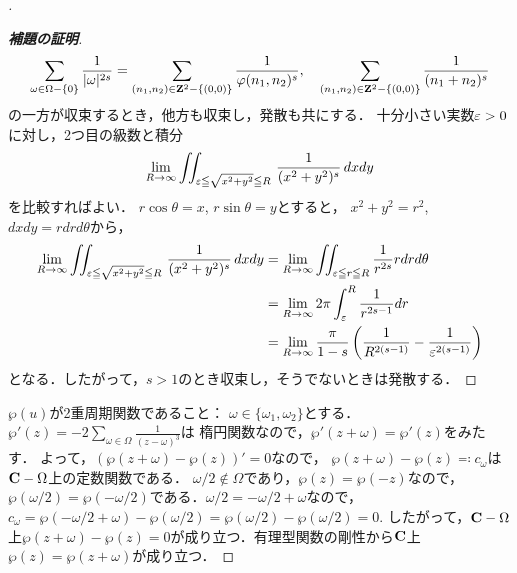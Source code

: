 \begin{proof}[\pfb]
\begin{proof}[\textbf{補題の証明}]
        \begin{align*}
            \sum_{\omega\in\Omega-\{0\}}\frac{1}{|\omega|^{2s}}
            =\sum_{(n_1,n_2)\in\mathbf{Z}^2-\{(0,0)\}}\frac{1}{\varphi(n_1,n_2)^s},\quad
            \sum_{(n_1,n_2)\in\mathbf{Z}^2-\{(0,0)\}}\frac{1}{(n_1+n_2)^s}
        \end{align*}
        の一方が収束するとき，他方も収束し，発散も共にする．
        十分小さい実数$\varepsilon>0$に対し，2つ目の級数と積分
        \begin{align*}
            \lim_{R\to\infty}\iint_{\varepsilon\leqq\sqrt{x^2+y^2}\leqq R}\,\frac{1}{(x^2+y^2)^s}\,dxdy
        \end{align*}
        を比較すればよい．
        $r\cos\theta=x$, $r\sin\theta=y$とすると，
        $x^2+y^2=r^2$, $dxdy=rdrd\theta$から，
        \begin{align*}
            \lim_{R\to\infty}\iint_{\varepsilon\leqq\sqrt{x^2+y^2}\leqq R}\,\frac{1}{(x^2+y^2)^s}\,dxdy
            &=
            \lim_{R\to\infty}
            \iint_{\varepsilon\leqq r\leqq R}\frac{1}{r^{2s}}rdrd\theta\\
            &=
            \lim_{R\to\infty} 2\pi\int_{\varepsilon}^{R}\frac{1}{r^{2s-1}}dr\\
            &=
            \lim_{R\to\infty}\frac{\pi}{1-s}\left(\frac{1}{R^{2(s-1)}}-\frac{1}{\varepsilon^{2(s-1)}}\right)
        \end{align*}
        となる．したがって，$s>1$のとき収束し，そうでないときは発散する．
    \end{proof}


    $\wp(u)$が2重周期関数であること：
    $\omega\in\{\omega_1,\omega_2\}$とする．$\wp'(z)=-2\sum_{\omega\in\Omega}\frac{1}{(z-\omega)^3}$は
    楕円関数なので，$\wp'(z+\omega)=\wp'(z)$をみたす．
    よって，$(\wp(z+\omega)-\wp(z))'=0$なので，
    $\wp(z+\omega)-\wp(z)\eqqcolon c_{\omega}$は$\mathbf{C}-\Omega$上の定数関数である．
    $\omega/2\notin\Omega$であり，$\wp(z)=\wp(-z)$なので，
    $\wp(\omega/2)=\wp(-\omega/2)$である．$\omega/2=-\omega/2+\omega$なので，
    $c_\omega=\wp(-\omega/2+\omega)-\wp(\omega/2)=\wp(\omega/2)-\wp(\omega/2)=0$. 
    したがって，$\mathbf{C}-\Omega$上$\wp(z+\omega)-\wp(z)=0$が成り立つ．有理型関数の剛性から$\mathbf{C}$上$\wp(z)=\wp(z+\omega)$が成り立つ．
\end{proof}
